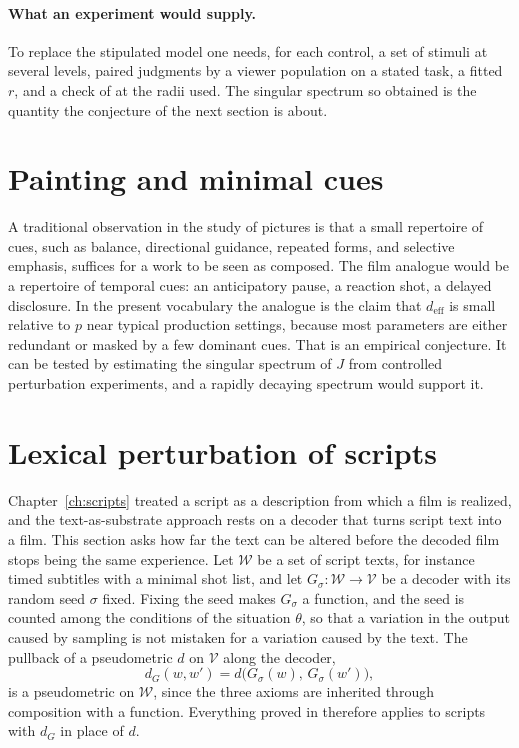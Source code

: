 \paragraph{What an experiment would supply.} To replace the stipulated model one needs, for each control, a set of stimuli at several levels, paired judgments by a viewer population on a stated task, a fitted $r$, and a check of  at the radii used. The singular spectrum so obtained is the quantity the conjecture of the next section is about.

\section{Painting and minimal cues}

A traditional observation in the study of pictures is that a small repertoire of cues, such as balance, directional guidance, repeated forms, and selective emphasis, suffices for a work to be seen as composed. The film analogue would be a repertoire of temporal cues: an anticipatory pause, a reaction shot, a delayed disclosure. In the present vocabulary the analogue is the claim that $d_{\mathrm{eff}}$ is small relative to $p$ near typical production settings, because most parameters are either redundant or masked by a few dominant cues. That is an empirical conjecture. It can be tested by estimating the singular spectrum of $J$ from controlled perturbation experiments, and a rapidly decaying spectrum would support it.

\section{Lexical perturbation of scripts}\label{sec:lexical}

Chapter~\ref{ch:scripts} treated a script as a description from which a film is realized, and the text-as-substrate approach rests on a decoder that turns script text into a film. This section asks how far the text can be altered before the decoded film stops being the same experience. Let $\mathcal{W}$ be a set of script texts, for instance timed subtitles with a minimal shot list, and let $G_\sigma:\mathcal{W}\to\mathcal{V}$ be a decoder with its random seed $\sigma$ fixed. Fixing the seed makes $G_\sigma$ a function, and the seed is counted among the conditions of the situation $\theta$, so that a variation in the output caused by sampling is not mistaken for a variation caused by the text. The pullback of a pseudometric $d$ on $\mathcal{V}$ along the decoder,
\[
d_G(w,w')=d\bigl(G_\sigma(w),\,G_\sigma(w')\bigr),
\]
is a pseudometric on $\mathcal{W}$, since the three axioms are inherited through composition with a function. Everything proved in  therefore applies to scripts with $d_G$ in place of $d$.

